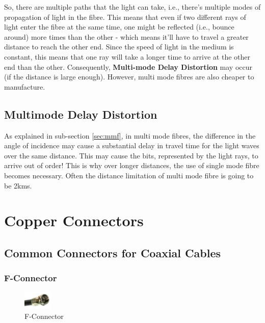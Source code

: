\noindent
So, there are multiple paths that the light can take, i.e., there's multiple modes of propagation of light in the fibre. This means that even if two different rays of light enter the fibre at the same time, one might be reflected (i.e., bounce around) more times than the other - which means it'll have to travel a greater distance to reach the other end. Since the speed of light in the medium is constant, this means that one ray will take a longer time to arrive at the other end than the other. Consequently, \textbf{Multi-mode Delay Distortion} may occur (if the distance is large enough). However, multi mode fibres are also cheaper to manufacture. 

\subsection{Multimode Delay Distortion}
As explained in sub-section \ref{sec:mmf}, in multi mode fibres, the difference in the angle of incidence may cause a substantial delay in travel time for the light waves over the same distance. This may cause the bits, represented by the light rays, to arrive out of order! This is why over longer distances, the use of single mode fibre becomes necessary. Often the distance limitation of multi mode fibre is going to be 2kms. 

\section{Copper Connectors}
\subsection{Common Connectors for Coaxial Cables}
\subsubsection{F-Connector}
\vspace{-10pt}
\begin{figure}
	\centering
	\vspace{-12pt}
	\includegraphics[width=0.12\textwidth]{"Mod1/chapters/1.4.f F-Connector"}
	\caption{\label{fig:f_con}F-Connector}
	\vspace{-10pt}
\end{figure}

